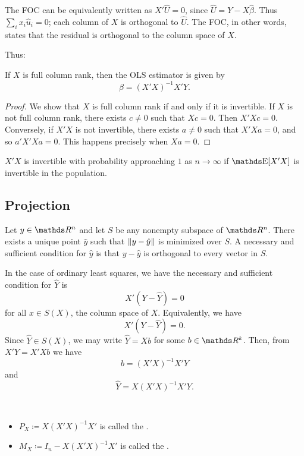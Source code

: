 \documentclass[letterpaper, 10pt]{article}
\begin{document}
\begin{remark}
  The FOC can be equivalently written as \(X'\hat{U} = 0\), since \(\hat{U} = Y - X \hat{\beta}\).
  Thus \(\sum_i x_i \hat{u}_i = 0\); each column of \(X\) is orthogonal to \(\hat{U}\).
  The FOC, in other words, states that the residual is orthogonal to the column space of \(X\).
\end{remark}
Thus:
\begin{proposition}
  If \(X\) is full column rank, then the OLS estimator is given by
  \[
    \hat{\beta} = (X'X)^{-1} X'Y.
  \]
\end{proposition}
\begin{proof}
  We show that \(X\) is full column rank if and only if it is invertible.
  If \(X\) is not full column rank, there exists \(c \neq 0\) such that \(Xc = 0\).
  Then \(X'Xc = 0\).
  Conversely, if \(X'X\) is not invertible, there exists \(a \neq 0\) such that \(X'X a = 0\), and so \(a' X' X a = 0\).
  This happens precisely when \(Xa = 0\).
\end{proof}
\begin{remark}
  \(X' X\) is invertible with probability approaching \(1\) as \(n \to \infty\) if \(\E[X'X]\) is invertible in the population.
\end{remark}



\subsection{Projection}
\begin{theorem}
  Let \(y \in \RR^n\) and let \(S\) be any nonempty subspace of \(\RR^n\).
  There exists a unique point \(\hat{y}\) such that \(\lVert y - \hat{y}\rVert\) is minimized over \(S\).
  A necessary and sufficient condition for \(\hat{y}\) is that \(y - \hat{y}\) is orthogonal to every vector in \(S\).
\end{theorem}

In the case of ordinary least squares, we have the necessary and sufficient condition for \(\hat{Y}\) is 
\[
  X'(Y - \hat{Y}) = 0
\]
for all \(x \in S(X)\), the column space of \(X\).
Equivalently, we have
\[
  X'(Y - \hat{Y}) = 0.
\]
Since \(\hat{Y} \in S(X)\), we may write \(\hat{Y} = Xb\) for some \(b \in \RR^k\).
Then, from \(X'Y = X'Xb\) we have
\[
  b = (X'X)^{-1} X'Y
\]
and
\[
  \hat{Y} = X (X'X)^{-1} X' Y.
\]
\begin{definition}~
  \begin{itemize}
    \item \(P_X \coloneqq X (X'X)^{-1} X'\) is called the .
    \item \(M_X \coloneqq I_n - X(X'X)^{-1} X'\) is called  the .
  \end{itemize}
\end{definition}
\end{document}

